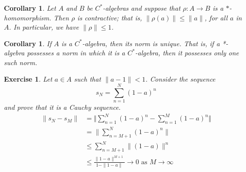 \documentclass{book}
\newtheorem{exercise}{Exercise}[section]
\newtheorem{corollary}[definition]{Corollary}
\def\cstar{\(C^*\)-algebra}
\begin{document}
\begin{corollary}\label{cor:137}
  Let \(A\) and \(B\) be \(C^*\)-algebras and suppose that \(\rho: A \rightarrow B\)
  is a \(*\)-homomorphism. Then \(\rho\) is contractive; that is, \(\|\rho(a)\| \leq \|a\|\), for all
  \(a\) in \(A\). In particular, we have \(\|\rho\|\leq 1\).
\end{corollary}
\begin{corollary}\label{corollary:138}
  If \(A\) is a \cstar, then its norm is unique. That is, if
  a *-algebra possesses a norm in which it is a \cstar, then it possesses only one such norm.
\end{corollary}
\begin{exercise}
Let \(a\in A\) such that \(\|a-1\|<1\). Consider the sequence
\[
  s_N=\sum_{n=1}^{N}{(1-a)}^n
\]
and prove that it is a Cauchy sequence.
\begin{align*}
  \|s_N-s_M\|&=\Vert\sum_{n=1}^{N}{(1-a)}^n-\sum_{n=1}^{M}{(1-a)}^n\Vert \\
  &=\|\sum_{n=M+1}^{N}{(1-a)}^n\|\\
  &\leq\sum_{n=M+1}^{N}\|(1-a)\|^n\\
  &\leq\frac{\|1-a\|^{M+1}}{1-\|1-a\|}\rightarrow 0\mbox{ as } M\rightarrow \infty 
\end{align*}
\end{exercise}
\end{document}
